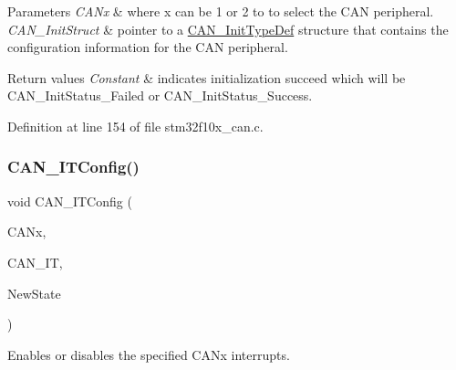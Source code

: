 \begin{DoxyParams}{Parameters}
{\em C\+A\+Nx} & where x can be 1 or 2 to to select the C\+AN peripheral. \\
\hline
{\em C\+A\+N\+\_\+\+Init\+Struct} & pointer to a \hyperlink{struct_c_a_n___init_type_def}{C\+A\+N\+\_\+\+Init\+Type\+Def} structure that contains the configuration information for the C\+AN peripheral. \\
\hline
\end{DoxyParams}

\begin{DoxyRetVals}{Return values}
{\em Constant} & indicates initialization succeed which will be C\+A\+N\+\_\+\+Init\+Status\+\_\+\+Failed or C\+A\+N\+\_\+\+Init\+Status\+\_\+\+Success. \\
\hline
\end{DoxyRetVals}


Definition at line 154 of file stm32f10x\+\_\+can.\+c.

\mbox{\label{group___c_a_n___exported___functions_gad1a8b2499a780b5bfa4accb3597b02f4}} 
\subsubsection{\texorpdfstring{C\+A\+N\+\_\+\+I\+T\+Config()}{CAN\_ITConfig()}}
{\footnotesize\ttfamily void C\+A\+N\+\_\+\+I\+T\+Config (\begin{DoxyParamCaption}\item[{\hyperlink{struct_c_a_n___type_def}{C\+A\+N\+\_\+\+Type\+Def} $\ast$}]{C\+A\+Nx,  }\item[{uint32\+\_\+t}]{C\+A\+N\+\_\+\+IT,  }\item[{\hyperlink{group___exported__types_gac9a7e9a35d2513ec15c3b537aaa4fba1}{Functional\+State}}]{New\+State }\end{DoxyParamCaption})}



Enables or disables the specified C\+A\+Nx interrupts. 



